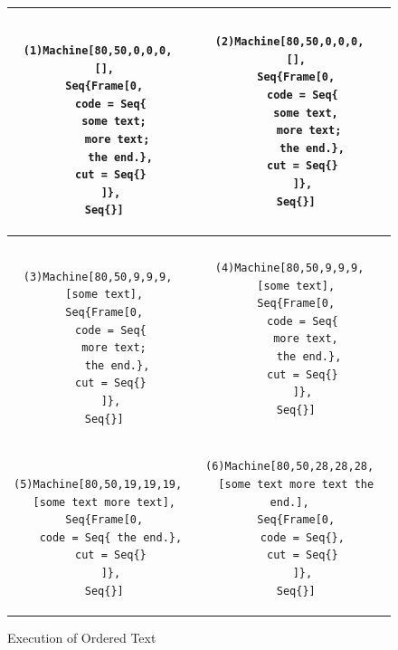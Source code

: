 \begin{figure}
\begin{center}
\begin{tabular}{|c|c|}
\hline
\begin{minipage}{2in}
\begin{lstlisting}

(1)Machine[80,50,0,0,0,
  [],
  Seq{Frame[0,
    code = Seq{
      some text; 
       more text; 
       the end.},
    cut = Seq{}
    ]},
  Seq{}]

\end{lstlisting}
\end{minipage}
&
\begin{minipage}{2in}
\begin{lstlisting}
(2)Machine[80,50,0,0,0,
  [],
  Seq{Frame[0,
    code = Seq{
      some text, 
       more text; 
       the end.},
    cut = Seq{}
    ]},
  Seq{}]
\end{lstlisting}
\end{minipage}
\\\hline
\begin{minipage}{2in}
\begin{lstlisting}

(3)Machine[80,50,9,9,9,
  [some text],
  Seq{Frame[0,
    code = Seq{
      more text; 
      the end.},
    cut = Seq{}
    ]},
  Seq{}]

\end{lstlisting}
\end{minipage}
&
\begin{minipage}{2in}
\begin{lstlisting}
(4)Machine[80,50,9,9,9,
  [some text],
  Seq{Frame[0,
    code = Seq{
      more text, 
      the end.},
    cut = Seq{}
    ]},
  Seq{}]
\end{lstlisting}
\end{minipage}
\\\hline
\begin{minipage}{2.3in}
\begin{lstlisting}

(5)Machine[80,50,19,19,19,
  [some text more text],
  Seq{Frame[0,
    code = Seq{ the end.},
    cut = Seq{}
    ]},
  Seq{}]

\end{lstlisting}
\end{minipage}
&
\begin{minipage}{2.7in}
\begin{lstlisting}
(6)Machine[80,50,28,28,28,
  [some text more text the end.],
  Seq{Frame[0,
    code = Seq{},
    cut = Seq{}
    ]},
  Seq{}]
\end{lstlisting}
\end{minipage}
\\\hline
\end{tabular}

\caption{Execution of Ordered Text\label{fig:Execution-of-Ordered}}

\end{center}
\end{figure}


